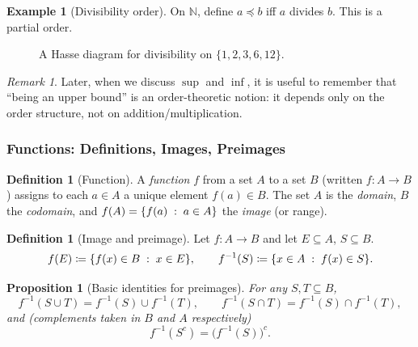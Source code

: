 \documentclass[12pt]{article}
\numberwithin{equation}{section}
\newcommand{\NN}{\mathbb{N}}
\DeclarePairedDelimiter{\set}{\{}{\}}
\newcommand{\st}{\;:\;}                      %
\theoremstyle{plain}
\newtheorem{proposition}[theorem]{Proposition}
\theoremstyle{definition}
\newtheorem{definition}[theorem]{Definition}
\newtheorem{example}[theorem]{Example}
\theoremstyle{remark}
\newtheorem{remark}[theorem]{Remark}
\begin{document}
\begin{example}[Divisibility order]
On $\NN$, define $a\preceq b$ iff $a$ divides $b$. This is a partial order.
\end{example}

\begin{figure}[H]
\centering
{}
\caption{A Hasse diagram for divisibility on $\{1,2,3,6,12\}$.}
\end{figure}

\begin{remark}
Later, when we discuss $\sup$ and $\inf$, it is useful to remember that ``being an upper bound'' is an order-theoretic notion: it depends only on the order structure, not on addition/multiplication.
\end{remark}

\subsubsection{Functions: Definitions, Images, Preimages}

\begin{definition}[Function]
A \emph{function} $f$ from a set $A$ to a set $B$ (written $f:A\to B$) assigns to each $a\in A$ a unique element $f(a)\in B$.  
The set $A$ is the \emph{domain}, $B$ the \emph{codomain}, and $f(A)=\set*{f(a)\st a\in A}$ the \emph{image} (or range).
\end{definition}

\begin{definition}[Image and preimage]
Let $f:A\to B$ and let $E\subseteq A$, $S\subseteq B$.
\[
f(E) \coloneqq \set*{f(x)\in B \st x\in E},
\qquad
f^{-1}(S) \coloneqq \set*{x\in A \st f(x)\in S}.
\]
\end{definition}

\begin{proposition}[Basic identities for preimages]\label{prop:preimage}
For any $S,T\subseteq B$,
\[
f^{-1}(S\cup T) = f^{-1}(S)\cup f^{-1}(T),
\qquad
f^{-1}(S\cap T) = f^{-1}(S)\cap f^{-1}(T),
\]
and (complements taken in $B$ and $A$ respectively)
\[
f^{-1}(S^c) = \bigl(f^{-1}(S)\bigr)^c.
\]
\end{proposition}
\end{document}
